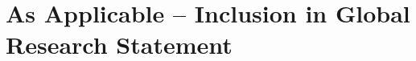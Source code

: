 \documentclass[draft]{agujournal2019}
\begin{document}
\section*{As Applicable – Inclusion in Global Research Statement}



\acknowledgments


%

%
\end{document}
